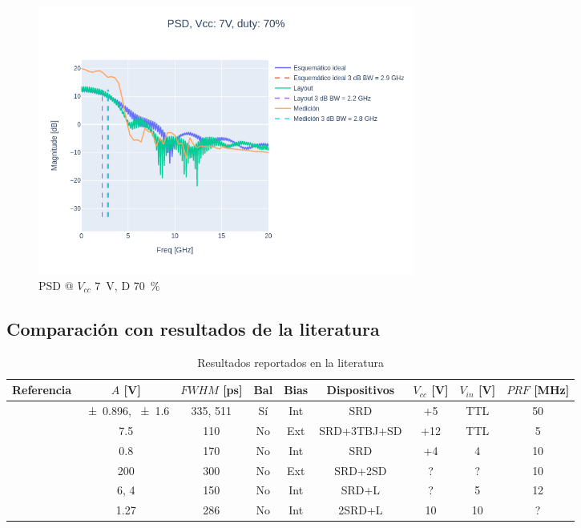\begin{figure}
  \centering
    \includegraphics[width=0.6\textwidth]{images/plots/Vcc_7V_duty_70_psd.png}
    \caption{PSD @ $V_{cc}$ \qty{7}{\volt}, D \qty{70}{\percent} }
    \label{fig:psd_7v_70}
\end{figure}

\subsection{Comparación con resultados de la literatura}

\begin{table}[htbp]
    \centering
    \caption{Resultados reportados en la literatura}
    \label{tab:mytable}
    {\small
    \begin{tabular}{ccccccccc}
        \hline
        Referencia & $A$ [\unit{\volt}] & $FWHM$ [\unit{\pico\second}] &
        Bal & Bias & Dispositivos & $V_{cc}$ [\unit{\volt}] & $V_{in}$ [\unit{\volt}] & $PRF$ [\unit{\mega\hertz}] \\
        \hline
        \cite{rulikowski2004} & \num{\pm 0.896}, \num{\pm 1.6} & 335, 511 & Sí & Int & SRD & +5 & TTL & 50 \\
        \cite{protiva2009} & \num{7.5} & 110 & No & Ext & SRD+3TBJ+SD & +12 & TTL & 5 \\
        \cite{kamal2014} & \num{0.8} & 170 & No & Int & SRD & +4 & 4 & 10 \\
        \cite{han2002} & \num{200} & 300 & No & Ext & SRD+2SD & ? & ? & 10 \\
        \cite{han2005} & \num{+6}, \num{+4} & 150 & No & Int & SRD+L & ? & 5 & 12 \\
        \cite{oloumi2018} & \num{1.27} & 286 & No & Int & 2SRD+L & 10 & 10 & ? \\
    \end{tabular}
    }
\end{table}
